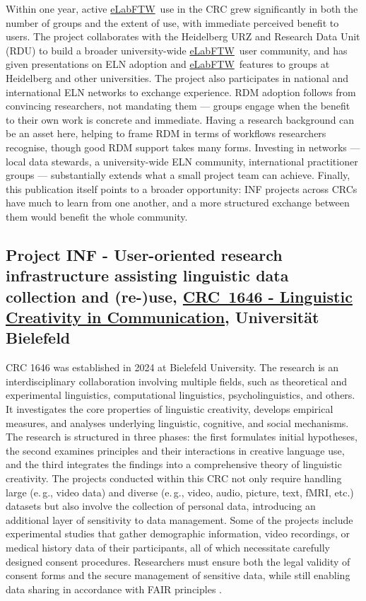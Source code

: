 \documentclass{eceasst}
\newcommand{\eg}{e.\,g.}
\newcommand{\elabftw}{\href{https://www.elabftw.net/}{eLabFTW}}
\begin{document}
Within one year, active \elabftw~use in the CRC grew significantly in both the number of groups and the extent of use, with immediate perceived benefit to users.
The project collaborates with the Heidelberg URZ and Research Data Unit (RDU) to build a broader university-wide \elabftw~user community, and has given presentations on ELN adoption and \elabftw~features to groups at Heidelberg and other universities.
The project also participates in national and international ELN networks to exchange experience.
RDM adoption follows from convincing researchers, not mandating them --- groups engage when the benefit to their own work is concrete and immediate.
Having a research background can be an asset here, helping to frame RDM in terms of workflows researchers recognise, though good RDM support takes many forms.
Investing in networks --- local data stewards, a university-wide ELN community, international practitioner groups --- substantially extends what a small project team can achieve.
Finally, this publication itself points to a broader opportunity: INF projects across CRCs have much to learn from one another, and a more structured exchange between them would benefit the whole community.

\subsection{Project INF - User-oriented research infrastructure assisting linguistic data collection and (re-)use, \href{https://www.uni-bielefeld.de/sfb/sfb1646/}{CRC~1646 -  Linguistic Creativity in Communication}, Universität Bielefeld}
CRC 1646 was established in 2024 at Bielefeld University.
The research is an interdisciplinary collaboration involving multiple fields, such as theoretical and experimental linguistics, computational linguistics, psycholinguistics, and others.
It investigates the core properties of linguistic creativity, develops empirical measures, and analyses underlying linguistic, cognitive, and social mechanisms. The research is structured in three phases: the first formulates initial hypotheses, the second examines principles and their interactions in creative language use, and the third integrates the findings into a comprehensive theory of linguistic creativity.
The projects conducted within this CRC not only require handling large (\eg, video data) and diverse (\eg, video, audio, picture, text, fMRI, etc.) datasets but also involve the collection of personal data, introducing an additional layer of sensitivity to data management.
Some of the projects include experimental studies that gather demographic information, video recordings, or medical history data of their participants, all of which necessitate carefully designed consent procedures.
Researchers must ensure both the legal \cite{GDPR2016} validity of consent forms and the secure management of sensitive data, while still enabling data sharing in accordance with FAIR principles \cite{WilkinsonDumontier2016}.
\end{document}
